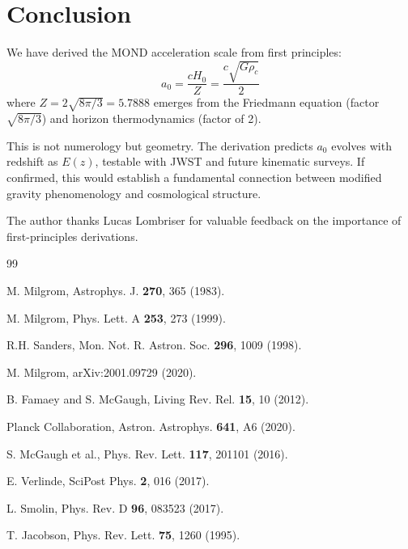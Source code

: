 \documentclass[twocolumn,showpacs,preprintnumbers,amsmath,amssymb,prd]{revtex4-2}
\begin{document}
\section{Conclusion}

We have derived the MOND acceleration scale from first principles:
\begin{equation}
a_0 = \frac{cH_0}{Z} = \frac{c\sqrt{G\rho_c}}{2}
\end{equation}
where $Z = 2\sqrt{8\pi/3} = 5.7888$ emerges from the Friedmann equation (factor $\sqrt{8\pi/3}$) and horizon thermodynamics (factor of 2).

This is not numerology but geometry. The derivation predicts $a_0$ evolves with redshift as $E(z)$, testable with JWST and future kinematic surveys. If confirmed, this would establish a fundamental connection between modified gravity phenomenology and cosmological structure.

\begin{acknowledgments}
The author thanks Lucas Lombriser for valuable feedback on the importance of first-principles derivations.
\end{acknowledgments}

\begin{thebibliography}{99}

 M. Milgrom, Astrophys. J. \textbf{270}, 365 (1983).

 M. Milgrom, Phys. Lett. A \textbf{253}, 273 (1999).

 R.H. Sanders, Mon. Not. R. Astron. Soc. \textbf{296}, 1009 (1998).

 M. Milgrom, arXiv:2001.09729 (2020).

 B. Famaey and S. McGaugh, Living Rev. Rel. \textbf{15}, 10 (2012).

 Planck Collaboration, Astron. Astrophys. \textbf{641}, A6 (2020).

 S. McGaugh et al., Phys. Rev. Lett. \textbf{117}, 201101 (2016).

 E. Verlinde, SciPost Phys. \textbf{2}, 016 (2017).

 L. Smolin, Phys. Rev. D \textbf{96}, 083523 (2017).

 T. Jacobson, Phys. Rev. Lett. \textbf{75}, 1260 (1995).

\end{thebibliography}
\end{document}
